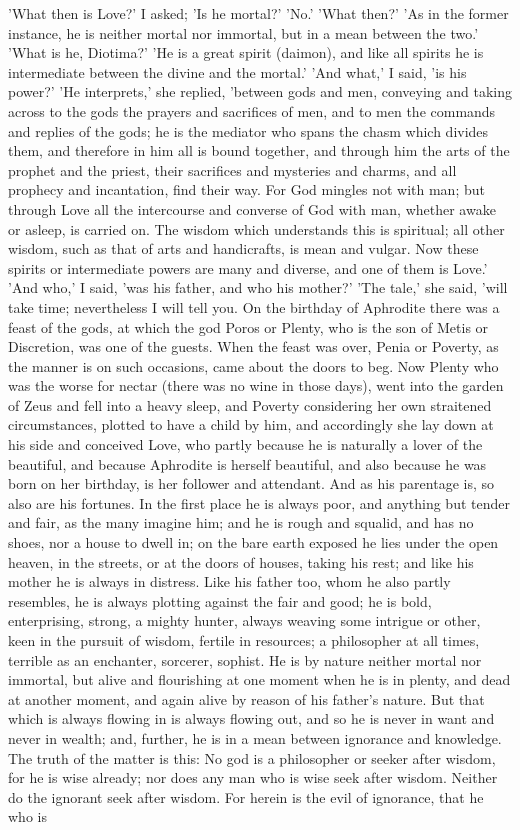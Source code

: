 \documentclass[11pt,letter]{article}
\begin{document}
\par  'What then is Love?' I asked; 'Is he mortal?' 'No.' 'What then?' 'As in the former instance, he is neither mortal nor immortal, but in a mean between the two.' 'What is he, Diotima?' 'He is a great spirit (daimon), and like all spirits he is intermediate between the divine and the mortal.' 'And what,' I said, 'is his power?' 'He interprets,' she replied, 'between gods and men, conveying and taking across to the gods the prayers and sacrifices of men, and to men the commands and replies of the gods; he is the mediator who spans the chasm which divides them, and therefore in him all is bound together, and through him the arts of the prophet and the priest, their sacrifices and mysteries and charms, and all prophecy and incantation, find their way. For God mingles not with man; but through Love all the intercourse and converse of God with man, whether awake or asleep, is carried on. The wisdom which understands this is spiritual; all other wisdom, such as that of arts and handicrafts, is mean and vulgar. Now these spirits or intermediate powers are many and diverse, and one of them is Love.' 'And who,' I said, 'was his father, and who his mother?' 'The tale,' she said, 'will take time; nevertheless I will tell you. On the birthday of Aphrodite there was a feast of the gods, at which the god Poros or Plenty, who is the son of Metis or Discretion, was one of the guests. When the feast was over, Penia or Poverty, as the manner is on such occasions, came about the doors to beg. Now Plenty who was the worse for nectar (there was no wine in those days), went into the garden of Zeus and fell into a heavy sleep, and Poverty considering her own straitened circumstances, plotted to have a child by him, and accordingly she lay down at his side and conceived Love, who partly because he is naturally a lover of the beautiful, and because Aphrodite is herself beautiful, and also because he was born on her birthday, is her follower and attendant. And as his parentage is, so also are his fortunes. In the first place he is always poor, and anything but tender and fair, as the many imagine him; and he is rough and squalid, and has no shoes, nor a house to dwell in; on the bare earth exposed he lies under the open heaven, in the streets, or at the doors of houses, taking his rest; and like his mother he is always in distress. Like his father too, whom he also partly resembles, he is always plotting against the fair and good; he is bold, enterprising, strong, a mighty hunter, always weaving some intrigue or other, keen in the pursuit of wisdom, fertile in resources; a philosopher at all times, terrible as an enchanter, sorcerer, sophist. He is by nature neither mortal nor immortal, but alive and flourishing at one moment when he is in plenty, and dead at another moment, and again alive by reason of his father's nature. But that which is always flowing in is always flowing out, and so he is never in want and never in wealth; and, further, he is in a mean between ignorance and knowledge. The truth of the matter is this: No god is a philosopher or seeker after wisdom, for he is wise already; nor does any man who is wise seek after wisdom. Neither do the ignorant seek after wisdom. For herein is the evil of ignorance, that he who is 
\end{document}
